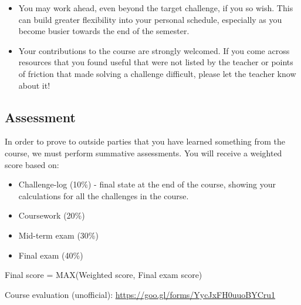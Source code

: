 \begin{itemize}
    \item You may work ahead, even beyond the target challenge, if you so wish. This can build greater flexibility into your personal schedule, especially as you become busier towards the end of the semester.
    \item Your contributions to the course are strongly welcomed. If you come across resources that you found useful that were not listed by the teacher or points of friction that made solving a challenge difficult, please let the teacher know about it!
\end{itemize}

\subsection{Assessment}
In order to prove to outside parties that you have learned something from the course, we must perform summative assessments. You will receive a weighted score based on:

\begin{itemize}
    \item Challenge-log (10\%) - final state at the end of the course, showing your calculations for all the challenges in the course.
    \item Coursework (20\%)
    \item Mid-term exam (30\%)
    \item Final exam (40\%)
\end{itemize}

Final score = MAX(Weighted score, Final exam score)

Course evaluation (unofficial): \url{https://goo.gl/forms/YycJxFH0uuoBYCru1}
